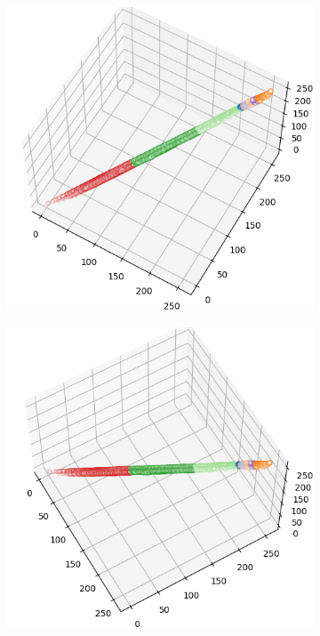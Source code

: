 \begin{figure}[htbp]
\begin{subfigure}[t]{0.32\textwidth}
    \end{subfigure}
    \begin{subfigure}[t]{0.32\textwidth}
        \includegraphics[width=\linewidth]{../../python_code/plots/kmeans/horse-137/clusters_elev60_azim-60.png}
    \end{subfigure}
    \begin{subfigure}[t]{0.32\textwidth}
        \includegraphics[width=\linewidth]{../../python_code/plots/kmeans/horse-137/clusters_elev60_azim-30.png}

\end{subfigure}
\end{figure}
